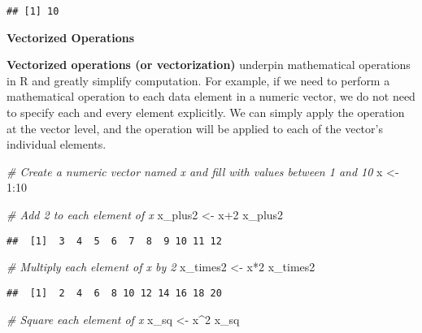\documentclass[
]{book}
\newenvironment{Shaded}{\begin{snugshade}}{\end{snugshade}}
\newcommand{\CommentTok}[1]{\textcolor[rgb]{0.56,0.35,0.01}{\textit{#1}}}
\newcommand{\DecValTok}[1]{\textcolor[rgb]{0.00,0.00,0.81}{#1}}
\newcommand{\NormalTok}[1]{#1}
\newcommand{\OtherTok}[1]{\textcolor[rgb]{0.56,0.35,0.01}{#1}}
\newcommand{\SpecialCharTok}[1]{\textcolor[rgb]{0.00,0.00,0.00}{#1}}
\begin{document}
\begin{verbatim}
## [1] 10
\end{verbatim}

\textbf{Vectorized Operations}

\textbf{Vectorized operations (or vectorization)} underpin mathematical operations in R and greatly simplify computation. For example, if we need to perform a mathematical operation to each data element in a numeric vector, we do not need to specify each and every element explicitly. We can simply apply the operation at the vector level, and the operation will be applied to each of the vector's individual elements.

\begin{Shaded}
\begin{Highlighting}[]
\CommentTok{\# Create a numeric vector named x and fill with values between 1 and 10}
\NormalTok{x }\OtherTok{\textless{}{-}} \DecValTok{1}\SpecialCharTok{:}\DecValTok{10}
\end{Highlighting}
\end{Shaded}

\begin{Shaded}
\begin{Highlighting}[]
\CommentTok{\# Add 2 to each element of x}
\NormalTok{x\_plus2 }\OtherTok{\textless{}{-}}\NormalTok{ x}\SpecialCharTok{+}\DecValTok{2}
\NormalTok{x\_plus2}
\end{Highlighting}
\end{Shaded}

\begin{verbatim}
##  [1]  3  4  5  6  7  8  9 10 11 12
\end{verbatim}

\begin{Shaded}
\begin{Highlighting}[]
\CommentTok{\# Multiply each element of x by 2}
\NormalTok{x\_times2 }\OtherTok{\textless{}{-}}\NormalTok{ x}\SpecialCharTok{*}\DecValTok{2}
\NormalTok{x\_times2}
\end{Highlighting}
\end{Shaded}

\begin{verbatim}
##  [1]  2  4  6  8 10 12 14 16 18 20
\end{verbatim}

\begin{Shaded}
\begin{Highlighting}[]
\CommentTok{\# Square each element of x}
\NormalTok{x\_sq }\OtherTok{\textless{}{-}}\NormalTok{ x}\SpecialCharTok{\^{}}\DecValTok{2}
\NormalTok{x\_sq}
\end{Highlighting}
\end{Shaded}
\end{document}
